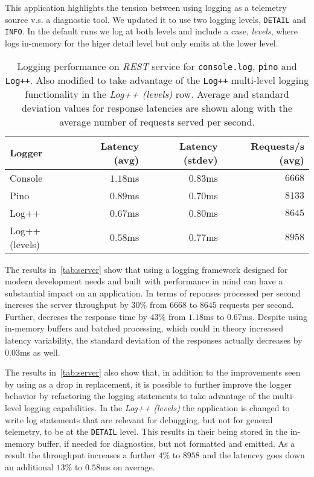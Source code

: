 This application highlights the tension between using logging as a telemetry source 
v.s. a diagnostic tool. We updated it to use two logging levels, \texttt{DETAIL} 
and \texttt{INFO}. In the default runs we log at both levels and include a case, 
\emph{levels}, where \projn logs in-memory for the higer detail level but only 
emits at the lower level.

\begin{table}[t]  
    \centering
    {\small
    \begin{tabular}{l | r r r }
    Logger       & Latency (avg) & Latency (stdev) & Requests/s (avg) \\
    \hline
    Console        & $1.18$ms & $0.83$ms & $6668$   \\
    Pino           & $0.89$ms & $0.70$ms & $8133$   \\
    Log++          & $0.67$ms & $0.80$ms & $8645$   \\
    Log++ (levels) & $0.58$ms & $0.77$ms & $8958$   \\
    \end{tabular}
    }
    \vspace{2mm}
    \caption{\small Logging performance on \emph{REST} service for \texttt{console.log}, 
    \texttt{pino} and \texttt{Log++}. Also modified to take advantage of the \texttt{Log++} 
    multi-level logging functionality in the \emph{Log++ (levels)} row. Average and 
    standard deviation values for response latencies are shown along with the average 
    number of requests served per second.}
    \label{tab:server}
\end{table}

The results in~\autoref{tab:server} show that using a logging framework designed 
for modern development needs and built with performance in mind can have a 
substantial impact on an application. In terms of reponses processed per second 
\projn increses the server throughput by $30\%$ from $6668$ to $8645$ requests 
per second. Further, \projn decreses the response time by $43\%$ 
from $1.18$ms to $0.67$ms. Despite using in-memory buffers and batched processing, 
which could in theory increased latency variability, the standard deviation of 
the responses actually decreases by $0.03$ms as well.

The results in~\autoref{tab:server} also show that, in addition to the improvements 
seen by using \projn as a drop in replacement, it is possible to further improve the 
logger behavior by refactoring the logging statements to take advantage of the 
multi-level logging capabilities. In the \emph{Log++ (levels)} the application is 
changed to write log statements that are relevant for debugging, but not for general 
telemetry, to be at the \texttt{DETAIL} level. This results in their being stored in 
the in-memory buffer, if needed for diagnostics, but not formatted and emitted. As 
a result the throughput increases a further $4\%$ to $8958$ and the latencey goes 
down an additional $13\%$ to $0.58$ms on average.


